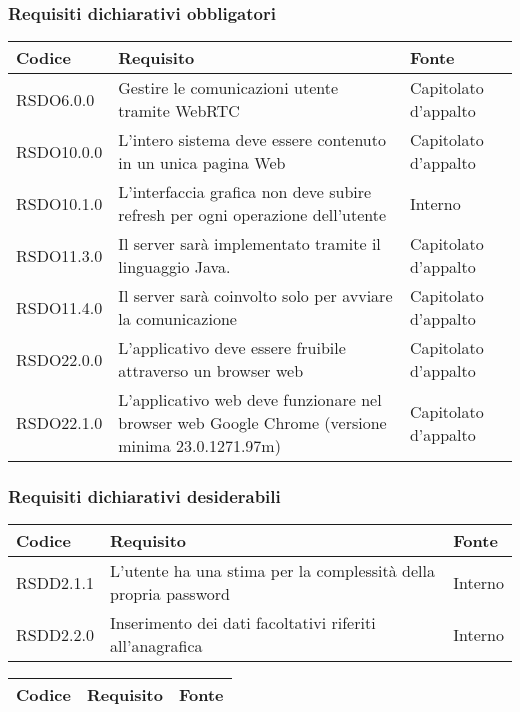 \subsubsection{Requisiti dichiarativi obbligatori}

\begin{center}
\begin{longtable}{lp{}l}
\toprule Codice & Requisito & Fonte\\
\midrule
RSDO6.0.0 & Gestire le comunicazioni utente tramite WebRTC & Capitolato d'appalto \\
RSDO10.0.0 & L'intero sistema deve essere contenuto in un unica pagina Web & Capitolato d'appalto \\
RSDO10.1.0 & L'interfaccia grafica non deve subire refresh per ogni operazione dell'utente & Interno \\
RSDO11.3.0 & Il server sarà implementato tramite il linguaggio Java. & Capitolato d'appalto \\
RSDO11.4.0 & Il server sarà coinvolto solo per avviare la comunicazione & Capitolato d'appalto \\
RSDO22.0.0 & L'applicativo deve essere fruibile attraverso un browser web & Capitolato d'appalto \\
RSDO22.1.0 & L'applicativo web deve funzionare nel browser web Google Chrome (versione minima 23.0.1271.97m) & Capitolato d'appalto \\
\bottomrule
\end{longtable}
\end{center}

\subsubsection{Requisiti dichiarativi desiderabili}

\begin{center}
\begin{longtable}{lp{}l}
\toprule Codice & Requisito & Fonte\\
\midrule
RSDD2.1.1 & L'utente ha una stima per la complessità della propria password & Interno \\
RSDD2.2.0 & Inserimento dei dati facoltativi riferiti all'anagrafica & Interno \\
\bottomrule
\end{longtable}
\end{center}

\begin{center}
\begin{longtable}{lp{}l}
\toprule Codice & Requisito & Fonte\\
\midrule
\bottomrule
\end{longtable}
\end{center}

